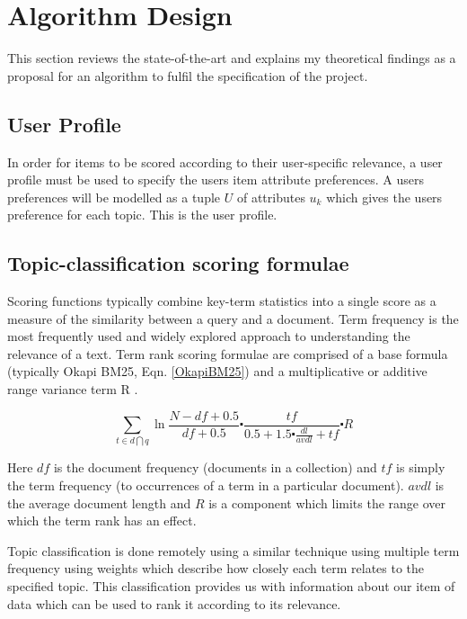 \chapter{Algorithm Design}
 
This section reviews the state-of-the-art and explains my theoretical findings as a proposal for an algorithm to fulfil the specification of the project. 

\section{User Profile}

In order for items to be scored according to their user-specific relevance, a user profile must be used to specify the users item attribute preferences. A users preferences will be modelled as a tuple $U$ of attributes $u_k$ which gives the users preference for each topic. This is the user profile.

\section{Topic-classification scoring formulae}

Scoring functions typically combine key-term statistics into a single score as a measure of the similarity between a query and a document.
Term frequency is the most frequently used and widely explored approach to understanding the relevance of a text. Term rank scoring formulae are comprised of a base formula (typically Okapi BM25, Eqn. \ref{OkapiBM25}) and a multiplicative or additive range variance term R \cite{OkapiBM25Paper}.

\begin{equation}\label{OkapiBM25}
	\sum\limits_{t\in d \bigcap q} \ln{\frac{N-df+0.5}{df+0.5}}\centerdot \frac{tf}{0.5+1.5 \centerdot \frac{dl}{avdl}+tf} \centerdot R
\end{equation}

Here $df$ is the document frequency (documents in a collection) and $tf$ is simply the term frequency (to occurrences of a term in a particular document). $avdl$ is the average document length and $R$ is a component which limits the range over which the term rank has an effect. 

Topic classification is done remotely using a similar technique using multiple term frequency using weights which describe how closely each term relates to the specified topic. This classification provides us with information about our item of data which can be used to rank it according to its relevance. 

